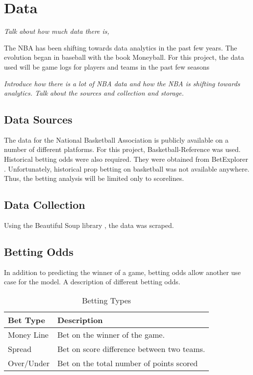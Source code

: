 \chapter{Data}\label{chapter:data}

\textit{Talk about how much data there is, }

The NBA has been shifting towards data analytics in the past few years.  The evolution began in baseball with the book Moneyball.  For this project, the data used will be game logs for players and teams in the past few seasons

\textit{Introduce how there is a lot of NBA data and how the NBA is shifting towards analytics.  Talk about the sources and collection and storage.}

\section{Data Sources}
The data for the National Basketball Association is publicly available on a number of different platforms.  For this project, Basketball-Reference \citep{basketball_reference} was used.  Historical betting odds were also required.  They were obtained from BetExplorer \citep{betting_odds}.  Unfortunately, historical prop betting on basketball was not available anywhere.  Thus, the betting analysis will be limited only to scorelines.

\section{Data Collection}

Using the Beautiful Soup library \cite{beautifulsoup}, the data was scraped.

\section{Betting Odds}

In addition to predicting the winner of a game, betting odds allow another use case for the model.
A description of different betting odds. \cite{betting_odds}

\begin{table}[ht]
\centering
\begin{tabular}{|l|l|}
\hline
\textbf{Bet Type} & \textbf{Description} \\ \hline
Money Line & Bet on the winner of the game. \\ \hline
Spread & Bet on score difference between two teams. \\ \hline
Over/Under & Bet on the total number of points scored \\ \hline
\end{tabular}
\caption{Betting Types}
\label{my-label}
\end{table}
